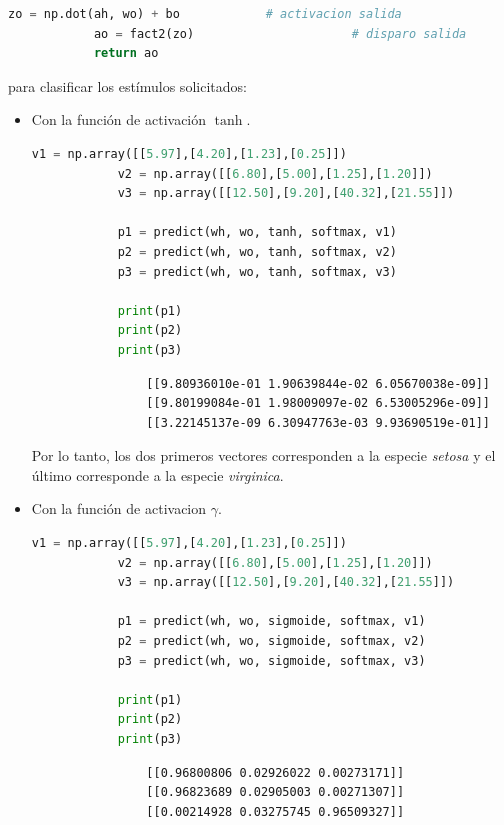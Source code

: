 \documentclass[letterpaper,11pt]{article}
\begin{document}
\begin{enumerate}
\begin{enumerate}
\begin{lstlisting}[language=Python]
            zo = np.dot(ah, wo) + bo            # activacion salida 
            ao = fact2(zo)                      # disparo salida
            return ao
        \end{lstlisting}

        para clasificar los estímulos solicitados:
        \begin{itemize}
            \item Con la función de activación $\tanh$.
            \begin{lstlisting}[language=Python]
            v1 = np.array([[5.97],[4.20],[1.23],[0.25]])
            v2 = np.array([[6.80],[5.00],[1.25],[1.20]])
            v3 = np.array([[12.50],[9.20],[40.32],[21.55]])

            p1 = predict(wh, wo, tanh, softmax, v1)
            p2 = predict(wh, wo, tanh, softmax, v2)
            p3 = predict(wh, wo, tanh, softmax, v3)

            print(p1)
            print(p2)
            print(p3)
            \end{lstlisting}

            \begin{verbatim}
                [[9.80936010e-01 1.90639844e-02 6.05670038e-09]]
                [[9.80199084e-01 1.98009097e-02 6.53005296e-09]]
                [[3.22145137e-09 6.30947763e-03 9.93690519e-01]]
            \end{verbatim}

            Por lo tanto, los dos primeros vectores corresponden a la especie 
            \textit{setosa} y el último corresponde a la especie 
            \textit{virginica}.

            \item Con la función de activacion $\gamma$.
            \begin{lstlisting}[language=Python]
            v1 = np.array([[5.97],[4.20],[1.23],[0.25]])
            v2 = np.array([[6.80],[5.00],[1.25],[1.20]])
            v3 = np.array([[12.50],[9.20],[40.32],[21.55]])

            p1 = predict(wh, wo, sigmoide, softmax, v1)
            p2 = predict(wh, wo, sigmoide, softmax, v2)
            p3 = predict(wh, wo, sigmoide, softmax, v3)

            print(p1)
            print(p2)
            print(p3)
            \end{lstlisting}

            \begin{verbatim}
                [[0.96800806 0.02926022 0.00273171]]
                [[0.96823689 0.02905003 0.00271307]]
                [[0.00214928 0.03275745 0.96509327]]
            \end{verbatim}


\end{itemize}
\end{enumerate}
\end{enumerate}
\end{document}
